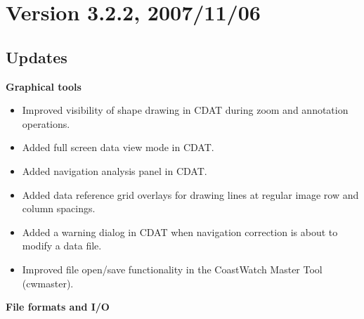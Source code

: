 \section*{Version 3.2.2, 2007/11/06}
  
\subsection*{ Updates}

\hspace{0.4cm} {\bf Graphical tools}

\begin{itemize}

  \item Improved visibility of shape drawing in CDAT during zoom and
  annotation operations.

  \item Added full screen data view mode in CDAT.

  \item Added navigation analysis panel in CDAT.

  \item Added data reference grid overlays for drawing lines at
  regular image row and column spacings.

  \item Added a warning dialog in CDAT when navigation correction is
  about to modify a data file.

  \item Improved file open/save functionality in the CoastWatch Master
  Tool (cwmaster).

\end{itemize}

\hspace{0.4cm} {\bf File formats and I/O}

